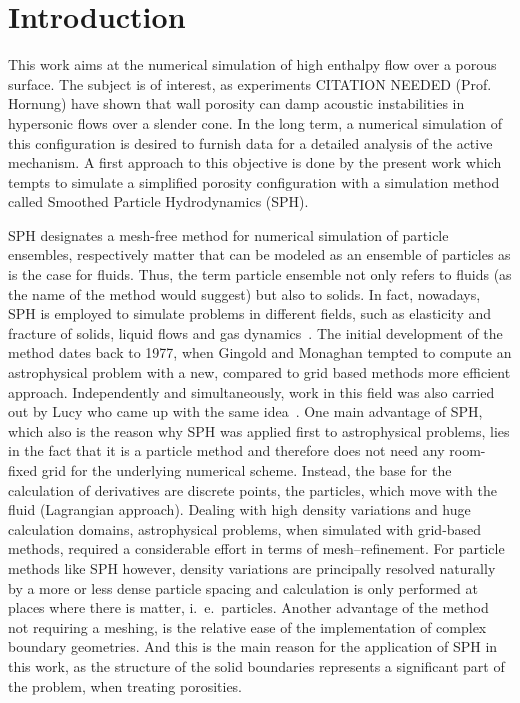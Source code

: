 \documentclass{report}
\begin{document}
%
%



\tableofcontents
\chapter{Introduction}
\label{sec:intro}


This work aims at the numerical simulation of high enthalpy flow over a porous
surface. The subject is of interest, as experiments CITATION
NEEDED (Prof. Hornung) have shown that wall porosity can damp
acoustic instabilities in hypersonic flows over a slender cone. In the long term, a numerical simulation of this configuration is desired to furnish data for a detailed analysis of the active mechanism. A first approach to this objective is done by the present work which tempts to simulate a simplified porosity configuration with a simulation method called Smoothed Particle Hydrodynamics (SPH). 

SPH designates a mesh-free method for numerical simulation of particle
ensembles, respectively matter that can be modeled as an ensemble of
particles as is the case for fluids.
Thus, the term particle ensemble not only refers
to fluids (as the name of the method would suggest) but also to solids. In
fact, nowadays, SPH is employed to simulate problems in different fields,
such as elasticity and fracture of solids, liquid flows and gas
dynamics~\cite{Monaghan2005}.
The initial development of the method dates back to 1977, when Gingold and
Monaghan \cite{Gingold1977} tempted to compute an astrophysical %
problem with a new, compared to grid based methods more efficient approach. Independently and simultaneously, work in this field was also carried out by Lucy who came up with the same idea~\cite{Lucy1977}. One main advantage of SPH, which also is the reason why SPH was applied first to astrophysical problems, lies in the fact that it is a particle method and therefore does not need any room-fixed grid for the underlying numerical scheme. Instead, the base for the calculation of derivatives are discrete points, the particles, which move with the fluid (Lagrangian approach). Dealing with high density variations and huge calculation domains, astrophysical problems, when simulated with grid-based methods, 
required a considerable effort in terms of mesh--refinement. For particle methods like SPH however, density variations are principally resolved naturally by a more or less dense particle spacing and calculation is only performed at places where there is matter, i.\ e.\ particles.
Another advantage of the method not requiring a meshing, is the relative ease of the implementation of complex boundary geometries. And this is the main reason for the application of SPH in this work, as the structure of the solid boundaries represents a significant part of the problem, when treating porosities. 
 
\end{document}
